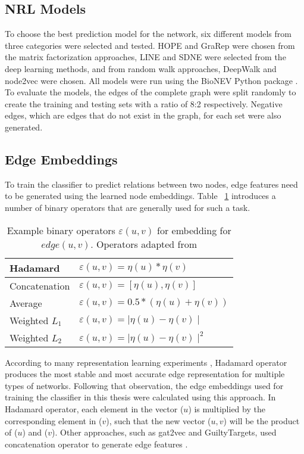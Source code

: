 \subsection{NRL Models}
To choose the best prediction model for the network, six different models from three categories were selected and tested. \ac{HOPE} and \ac{GraRep} were chosen from the matrix factorization approaches, \ac{LINE} and \ac{SDNE} were selected from the deep learning methods, and from random walk approaches, DeepWalk and node2vec were chosen. All models were run using the BioNEV Python package \cite{yue_graph_2019}. To evaluate the models, the edges of the complete graph were split randomly to create the training and testing sets with a ratio of 8:2 respectively. Negative edges, which are edges that do not exist in the graph, for each set were also generated.

\subsection{Edge Embeddings}
To train the classifier to predict relations between two nodes, edge features need to be generated using the learned node embeddings. Table ~\ref{tab:operators} introduces a number of binary operators that are generally used for such a task. 

\begin{table}[h!]
    \centering
    \begin{tabular}{ |l|l| } 
        \hline
        Hadamard & $\varepsilon(u,v)= \eta(u)*\eta(v)$ \\ 
        \hline
        Concatenation & $\varepsilon(u,v)=[\eta(u), \eta(v)]$ \\ 
        \hline
        Average & $\varepsilon(u,v)=0.5*(\eta(u)+\eta(v))$ \\ 
        \hline
        Weighted $L_{1}$ & $\varepsilon(u,v)=\mid\eta(u)-\eta(v)\mid$ \\
        \hline
        Weighted $L_{2}$ & $\varepsilon(u,v)=\mid\eta(u)-\eta(v)\mid^2$ \\
        \hline
    \end{tabular}
    \caption[Example binary operators $\varepsilon(u,v)$ for embedding for $edge(u,v)$]{Example binary operators $\varepsilon(u,v)$ for embedding for $edge(u,v)$. Operators adapted from \cite{grover_node2vec:_2016}}
    \label{tab:operators}
\end{table}


According to many representation learning experiments \cite{grover_node2vec:_2016, tsitsulin_verse:_2018, yuan_sne:_2017}, Hadamard operator produces the most stable and most accurate edge representation for multiple types of networks. Following that observation, the edge embeddings used for training the classifier in this thesis were calculated using this approach. In Hadamard operator, each element in the vector ($u$) is multiplied by the corresponding element in ($v$), such that the new vector ($u,v$) will be the product of ($u$) and ($v$). Other approaches, such as gat2vec and GuiltyTargets, used concatenation operator to generate edge features \cite{muslu_guiltytargets:_2019, sheikh_gat2vec:_2018}.

